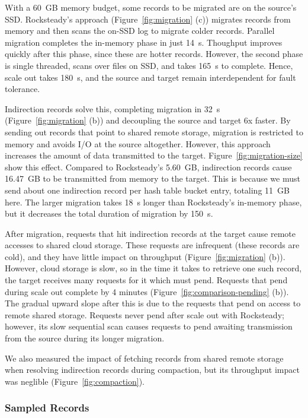 With a 60~GB memory budget, some records to be migrated are on the source's
SSD.
%
Rocksteady's approach (Figure~\ref{fig:migration} (c)) migrates records from
memory and then scans the on-SSD log to migrate colder records.
%
Parallel migration completes the in-memory phase in just 14~s.
%
Thoughput improves quickly after this phase, since these are hotter records.
%
However, the second phase is single threaded, scans over files on SSD,
and takes 165~s to complete.
%
Hence, scale out takes 180~s, and the source and target remain interdependent
for fault tolerance.

Indirection records solve this, completing migration in 32~s
(Figure~\ref{fig:migration} (b)) and decoupling the source and target 6x faster.
%
By sending out records that point to shared remote storage, migration
is restricted to memory and avoids I/O at the source altogether.
%
%
However, this approach increases the amount of data transmitted to the target.
%
Figure~\ref{fig:migration-size} show this effect.
%
Compared to Rocksteady's 5.60~GB, indirection records cause
16.47~GB to be transmitted from memory to the target.
%
This is because we must send about one indirection record per hash table bucket
entry, totaling 11~GB here.
%
%
The larger migration takes 18~s longer than Rocksteady's in-memory phase, but it
decreases the total duration of migration by 150~s.

After migration, requests that hit indirection records at the
target cause remote accesses to shared cloud storage.
%
These requests are infrequent (these records are
cold), and they have little impact on throughput
(Figure~\ref{fig:migration} (b)).
%
However, cloud storage is slow, so in the time it takes to retrieve one such
record, the target receives many requests for it which must pend.
%
Requests that pend during scale out complete by 4 minutes
(Figure~\ref{fig:comparison-pending} (b)).
%
The gradual upward slope after this is due to the requests that
pend on access to remote shared storage.
%
Requests never pend after scale out with Rocksteady; however, its slow
sequential scan causes requests to pend awaiting transmission from the source
during its longer migration.

We also measured the impact of fetching records from shared remote storage when
resolving indirection records during compaction, but its throughput impact was
neglible (Figure~\ref{fig:compaction}).

\subsubsection{Sampled Records}
\label{sec:eval:sampling}

